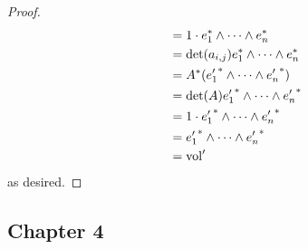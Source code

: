 \documentclass[../psets.tex]{subfiles}
\begin{document}
\begin{enumerate}[label={\textbf{1.9.\roman*.}}]
\begin{proof}
\begin{align*}
            &= 1\cdot e_1^*\wedge\cdots\wedge e_n^*\\
            &= \det(a_{i,j})e_1^*\wedge\cdots\wedge e_n^*\\
            &= A^*({e_1'}^*\wedge\cdots\wedge{e_n'}^*)\\
            &= \det(A){e_1'}^*\wedge\cdots\wedge{e_n'}^*\\
            &= 1\cdot {e_1'}^*\wedge\cdots\wedge{e_n'}^*\\
            &= {e_1'}^*\wedge\cdots\wedge{e_n'}^*\\
            &= \operatorname{vol}'
        \end{align*}
        as desired.
    \end{proof}
\end{enumerate}
\subsection*{Chapter 4}
\end{document}
